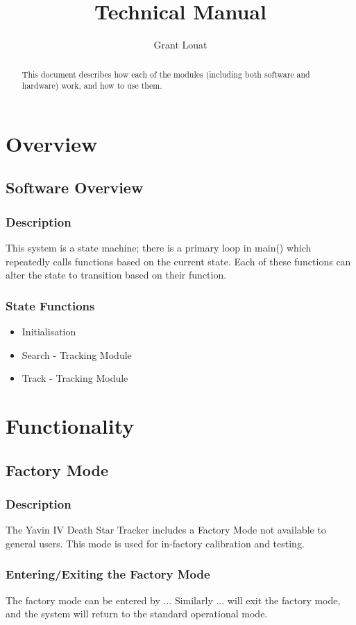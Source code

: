 \documentclass[]{report}
\title{Technical Manual}
\author{Grant Louat}
\begin{document}
\maketitle

\begin{abstract}
	This document describes how each of the modules (including both software and hardware) work, and how to use them.
\end{abstract}

\part{Overview}
\chapter{Software Overview}
\section{Description}
This system is a state machine; there is a primary loop in main() which repeatedly calls functions based on the current state. Each of these functions can alter the state to transition based on their function.

\section{State Functions}
\begin{itemize}
	\item Initialisation
	\item Search - Tracking Module
	\item Track - Tracking Module
\end{itemize}

\part{Functionality}
\chapter{Factory Mode}
\section{Description}
The Yavin IV Death Star Tracker includes a Factory Mode not available to general users. This mode is used for in-factory calibration and testing.

\section{Entering/Exiting the Factory Mode}
The factory mode can be entered by ... Similarly ... will exit the factory mode, and the system will return to the standard operational mode.
\end{document}
